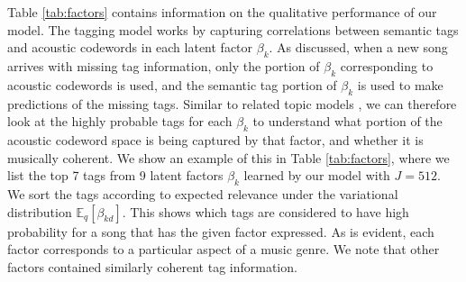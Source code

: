 Table \ref{tab:factors} contains information on the qualitative performance of our model. The tagging model works by capturing correlations between semantic tags and acoustic codewords in each latent factor $\beta_k$. As discussed, when a new song arrives with missing tag information, only the portion of $\beta_k$ corresponding to acoustic codewords is used, and the semantic tag portion of $\beta_k$ is used to make predictions of the missing tags. Similar to related topic models \cite{hoffman2013stochastic}, we can therefore look at the highly probable tags for each $\beta_k$ to understand what portion of the acoustic codeword space is being captured by that factor, and whether it is musically coherent. We show an example of this in Table \ref{tab:factors}, where we list the top 7 tags from 9 latent factors $\beta_k$ learned by our model with $J=512$. We sort the tags according to expected relevance under the variational distribution $\mathbb{E}_q[\beta_{kd}]$. This shows which tags are considered to have 
high probability for a song that has the given factor expressed. As is evident, each factor corresponds to a particular aspect of a music genre. We note that other factors contained similarly coherent tag information.


